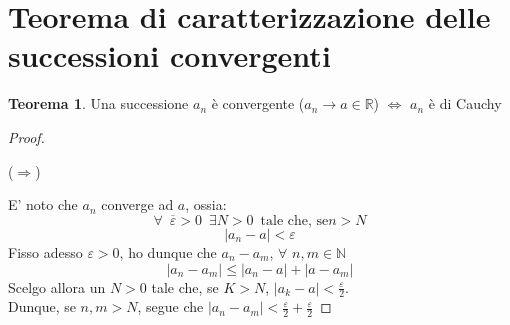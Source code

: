 \documentclass{article}
\theoremstyle{definition}
\newtheorem{thm}{Teorema}
\begin{document}
\section{Teorema di caratterizzazione delle successioni convergenti}
\begin{thm}
    Una successione $a_n$ è convergente ($a_n \to a \in \mathbb{R}$) $\Longleftrightarrow$ $a_n$ è di Cauchy
\end{thm}
\begin{proof}
\begin{center}
       ($\Rightarrow$) 
\end{center}
E' noto che $a_n$ converge ad $a$, ossia:
\begin{equation}
    \forall \,\,\, \overline{\varepsilon}>0 \,\,\, \exists N>0 \,\,\, \mbox{tale che, se} n>N
\end{equation}
\begin{equation}
    |a_n-a|<\varepsilon
\end{equation}
Fisso adesso $\varepsilon>0$, ho dunque che $a_n-a_m$, $\forall \,\, n,m \in \mathbb{N}$
\begin{equation}
    |a_n-a_m|\leqslant |a_n-a|+|a-a_m|
\end{equation}
Scelgo allora un $N>0$ tale che, se $K>N$, $|a_k-a|<\frac{\varepsilon}{2}$.
\\
Dunque, se $n,m>N$, segue che $|a_n-a_m|<\frac{\varepsilon}{2}+\frac{\varepsilon}{2}$





\end{proof}
\end{document}
